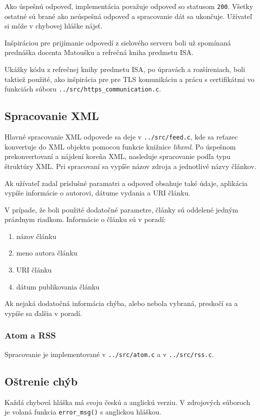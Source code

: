 Ako úspešnú odpoveď, implementácia považuje odpoveď so statusom {\tt 200}. Všetky ostatné\cite{ibmHttp} sú brané ako neúspešná odpoveď a spracovanie dát sa ukončuje. Užívateľ si môže v chybovej hláške nájsť.

Inšpiráciou pre prijímanie odpovedí z sielového serveru boli už spomínaná prednáška docenta Matoušku\cite{Matousek} a refrečná kniha predmetu ISA\cite{Winkle}.

Ukážky kódu z refrečnej knihy predmetu ISA\cite{Winkle}, po úpravách a rozšíreniach, boli taktiež použité, ako inšpirácia pre pre TLS komunikáciu a prácu s certifikátmi vo funkciách súboru {\tt ../src/https\_communication.c}.

\subsection*{Spracovanie XML}
Hlavné spracovanie XML odpovede sa deje v {\tt ../src/feed.c}, kde sa reťazec konvertuje do XML objektu pomocou funkcie knižnice {\it libxml}\cite{libxml}. Po úspešnom prekonvertovaní a nájdení koreňa XML, nasleduje spracovanie podľa typu štruktúry XML. Pri spracovaní sa vypíše názov zdroja a jednotlivé názvy článkov. 

Ak užívateľ zadal príslušné paramatri a odpoveď obsahuje také údaje, aplikácia vypíše informácie o autorovi, dátume vydania a URI článku. 

V prípade, že boli použité dodatočné parametre, články sú oddelené jedným prázdnym riadkom. Informácie o článku sú v poradí:
\begin{enumerate}
  \item{názov článku}
  \item{meno autora článku}
  \item{URI článku}
  \item{dátum publikovania článku}
\end{enumerate}

Ak nejaká dodatočná informácia chýba, alebo nebola vybraná, preskočí sa a vypíše sa ďalšia v poradí.

\subsubsection{Atom a RSS}
Spracovanie je implementované v {\tt ../src/atom.c} a v {\tt ../src/rss.c}.

\subsection*{Oštrenie chýb}
\label{err_label}
Každá chybová hláška má svoju českú a anglickú verziu. V zdrojových súboroch je volaná funkcia {\tt error\_msg()} s anglickou hláškou. 

